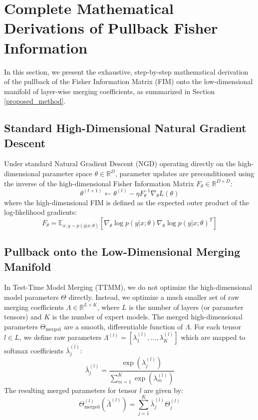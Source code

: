 \documentclass{article}
\theoremstyle{plain}
\theoremstyle{definition}
\theoremstyle{remark}
\begin{document}
\section{Complete Mathematical Derivations of Pullback Fisher Information}
\label{appendix:math_derivations}

In this section, we present the exhaustive, step-by-step mathematical derivation of the pullback of the Fisher Information Matrix (FIM) onto the low-dimensional manifold of layer-wise merging coefficients, as summarized in Section \ref{proposed_method}.

\subsection{Standard High-Dimensional Natural Gradient Descent}
Under standard Natural Gradient Descent (NGD) \cite{zhang_fast_2019, jnini_dual_2025} operating directly on the high-dimensional parameter space $\theta \in \mathbb{R}^D$, parameter updates are preconditioned using the inverse of the high-dimensional Fisher Information Matrix $F_{\theta} \in \mathbb{R}^{D \times D}$:
\begin{equation}
    \theta^{(t+1)} \leftarrow \theta^{(t)} - \eta F_{\theta}^{-1} \nabla_{\theta} L(\theta)
\end{equation}
where the high-dimensional FIM is defined as the expected outer product of the log-likelihood gradients:
\begin{equation}
    F_{\theta} = \mathbb{E}_{x, y \sim p(y|x; \theta)} \left[ \nabla_{\theta} \log p(y | x; \theta) \nabla_{\theta} \log p(y | x; \theta)^T \right]
\end{equation}

\subsection{Pullback onto the Low-Dimensional Merging Manifold}
In Test-Time Model Merging (TTMM), we do not optimize the high-dimensional model parameters $\Theta$ directly. Instead, we optimize a much smaller set of raw merging coefficients $\Lambda \in \mathbb{R}^{L \times K}$, where $L$ is the number of layers (or parameter tensors) and $K$ is the number of expert models. The merged high-dimensional parameters $\Theta_{\text{merged}}$ are a smooth, differentiable function of $\Lambda$. For each tensor $l \in L$, we define raw parameters $\Lambda^{(l)} = [\lambda_1^{(l)}, \dots, \lambda_K^{(l)}]$ which are mapped to softmax coefficients $\bar{\lambda}_j^{(l)}$:
\begin{equation}
    \bar{\lambda}_j^{(l)} = \frac{\exp(\lambda_j^{(l)})}{\sum_{m=1}^K \exp(\lambda_m^{(l)})}
\end{equation}
The resulting merged parameters for tensor $l$ are given by:
\begin{equation}
    \Theta_{\text{merged}}^{(l)}(\bar{\Lambda}^{(l)}) = \sum_{j=1}^K \bar{\lambda}_j^{(l)} \Theta_j^{(l)}
\end{equation}
\end{document}
